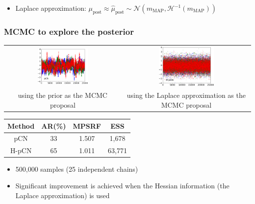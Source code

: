\documentclass{beamer}
\begin{document}
\begin{frame}[c]
  \vspace{0.1cm}

  \begin{itemize}
    \item Laplace approximation: $\mu_{\text{post}} \approx
      \hat{\mu}_{\text{post}} \sim \mathcal{N} (m_{\text{MAP}},
      \mathcal{H}^{-1} (m_{\text{MAP}}))$
  \end{itemize}
\end{frame}

\begin{frame}[c]
  \frametitle{MCMC to explore the posterior}

  \begin{tabulary}{\linewidth}{CC}
    \includegraphics[width=0.45\textwidth]{./figures/ex1_LargeNoise_trace_pcn.png}
    &
    \includegraphics[width=0.45\textwidth]{./figures/ex1_LargeNoise_trace_hpcn.png}
    \\
    {\tiny using the prior as the MCMC proposal}
    &
    {\tiny using the Laplace approximation as the MCMC proposal}
  \end{tabulary}

  \begin{center}
    \begin{tabular}{cccc}
      Method & AR(\%) & MPSRF & ESS
      \\
      \hline
      pCN & 33 & 1.507 & 1,678
      \\
      H-pCN & 65 & 1.011 & 63,771
    \end{tabular}
  \end{center}

  \begin{itemize}
    \item 500,000 samples (25 independent chains)
    \item Significant improvement is achieved when the Hessian information (the
      Laplace approximation) is
      used
  \end{itemize}
\end{frame}
\end{document}
